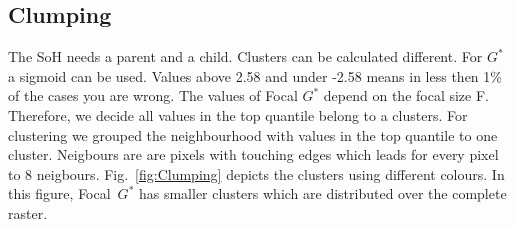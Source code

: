 \documentclass{itatnew}
\begin{document}
\subsection{Clumping}

The SoH needs a parent and a child. Clusters can be calculated different. For
$G^*$ a sigmoid can be used. Values above 2.58 and under -2.58 means in less
then 1\% of the cases you are wrong. The values of Focal $G^*$ depend on the
focal size F. Therefore, we decide all values in the top quantile belong to a
clusters. For clustering we grouped the neighbourhood with values in the top
quantile to one cluster. Neigbours are are pixels with touching edges which
leads for every pixel to 8 neigbours. Fig.~\ref{fig:Clumping} depicts the 
clusters using different colours. In this figure, Focal~$G^*$ has smaller 
clusters which are distributed over the complete raster.
\end{document}
